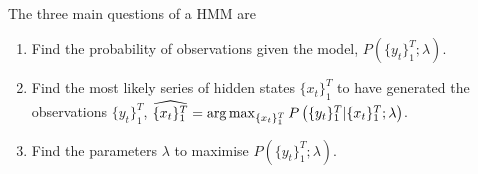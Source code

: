 \paragraph{}
	The three main questions of a HMM are
	\begin{enumerate}
		\item Find the probability of observations given the model, $P\left(\{y_t\}_1^T; \lambda\right)$.
		\item Find the most likely series of hidden states $\{x_t\}_1^T$ to have generated the observations $\{y_t\}_1^T$, $\widehat{\{x_t\}_1^T} = \operatorname*{arg\,max}_{\{x_t\}_1^T} P\left(\{y_t\}_1^T | \{x_t\}_1^T; \lambda\right)$.
		\item Find the parameters $\lambda$ to maximise $P\left(\{y_t\}_1^T; \lambda\right)$.
	\end{enumerate}